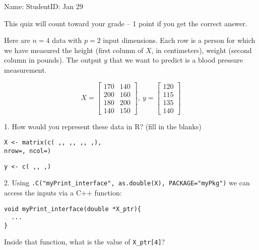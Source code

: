 \documentclass{article}
\begin{document}
\thispagestyle{empty}

Name: \underline{\hspace{2in}} StudentID: \underline{\hspace{2in}} Jan 29

This quiz will count toward your grade -- 1 point if you get the
correct answer.

Here are $n=4$ data with $p=2$ input dimensions. Each row is a person
for which we have measured the height (first column of $X$, in
centimeters), weight (second column in pounds). The output $y$ that we
want to predict is a blood pressure measurement.

\begin{equation*}
  X = \left[\begin{array}{cc}
              170 & 140 \\
              200 & 160 \\
              180 & 200 \\
              140 & 150 
\end{array}\right],\ 
  y = \left[\begin{array}{c}
              120 \\
              115 \\
              135 \\
              140 
\end{array}\right]
\end{equation*}

1. How would you represent these data in R? (fill in the blanks)

\texttt{X <- matrix(c(%
\underline{\hspace{1cm}},\underline{\hspace{1cm}},%
\underline{\hspace{1cm}},\underline{\hspace{1cm}},%
\underline{\hspace{1cm}},\underline{\hspace{1cm}},%
\underline{\hspace{1cm}},\underline{\hspace{1cm}}),\\
  nrow=\underline{\hspace{1cm}},
  ncol=\underline{\hspace{1cm}})}

\texttt{y <- c(%
\underline{\hspace{1cm}},\underline{\hspace{1cm}},%
\underline{\hspace{1cm}},\underline{\hspace{1cm}})}

2. Using \verb|.C("myPrint_interface", as.double(X), PACKAGE="myPkg")| we can
access the inputs via a C++ function:

\begin{verbatim}
void myPrint_interface(double *X_ptr){
  ...
}
\end{verbatim}

Inside that function, what is the value of \verb|X_ptr[4]|? \underline{\hspace{1in}}
\end{document}
